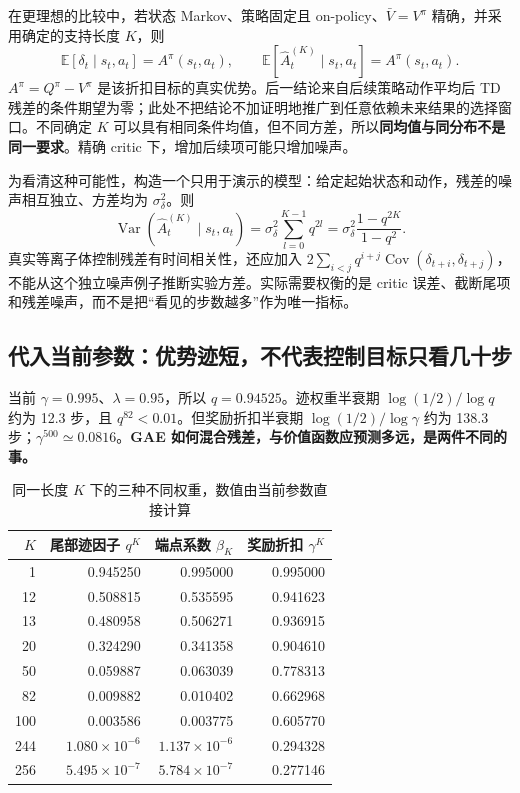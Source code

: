 \documentclass[12pt,fontset=none]{ctexart}
\numberwithin{equation}{section}
\numberwithin{table}{section}
\numberwithin{figure}{section}
\begin{document}
在更理想的比较中，若状态 Markov、策略固定且 on-policy、$\bar V=V^\pi$ 精确，并采用确定的支持长度 $K$，则
\begin{equation}\label{eq:gaet-unbiased}
 \mathbb E[\delta_t\mid s_t,a_t]=A^\pi(s_t,a_t),\qquad
 \mathbb E[\hat A_t^{(K)}\mid s_t,a_t]=A^\pi(s_t,a_t).
\end{equation}
$A^\pi=Q^\pi-V^\pi$ 是该折扣目标的真实优势。后一结论来自后续策略动作平均后 TD 残差的条件期望为零；此处不把结论不加证明地推广到任意依赖未来结果的选择窗口。不同确定 $K$ 可以具有相同条件均值，但不同方差，所以\textbf{同均值与同分布不是同一要求}。精确 critic 下，增加后续项可能只增加噪声。

为看清这种可能性，构造一个只用于演示的模型：给定起始状态和动作，残差的噪声相互独立、方差均为 $\sigma_\delta^2$。则
\begin{equation}\label{eq:gaet-noisevar}
 \operatorname{Var}(\hat A_t^{(K)}\mid s_t,a_t)
 =\sigma_\delta^2\sum_{l=0}^{K-1}q^{2l}
 =\sigma_\delta^2\frac{1-q^{2K}}{1-q^2}.
\end{equation}
真实等离子体控制残差有时间相关性，还应加入 $2\sum_{i<j}q^{i+j}\operatorname{Cov}(\delta_{t+i},\delta_{t+j})$，不能从这个独立噪声例子推断实验方差。实际需要权衡的是 critic 误差、截断尾项和残差噪声，而不是把``看见的步数越多''作为唯一指标。

\subsection{代入当前参数：优势迹短，不代表控制目标只看几十步}

当前 $\gamma=0.995$、$\lambda=0.95$，所以 $q=0.94525$。迹权重半衰期 $\log(1/2)/\log q$ 约为 12.3 步，且 $q^{82}<0.01$。但奖励折扣半衰期 $\log(1/2)/\log\gamma$ 约为 138.3 步；$\gamma^{500}\simeq0.0816$。\textbf{GAE 如何混合残差，与价值函数应预测多远，是两件不同的事。}

\begin{table}[!ht]
\centering\small
\caption{同一长度 $K$ 下的三种不同权重，数值由当前参数直接计算}\label{tab:gaet-weights}
\begin{tabular}{rrrr}
\toprule
$K$ & 尾部迹因子 $q^K$ & 端点系数 $\beta_K$ & 奖励折扣 $\gamma^K$ \\
\midrule
1 & 0.945250 & 0.995000 & 0.995000 \\
12 & 0.508815 & 0.535595 & 0.941623 \\
13 & 0.480958 & 0.506271 & 0.936915 \\
20 & 0.324290 & 0.341358 & 0.904610 \\
50 & 0.059887 & 0.063039 & 0.778313 \\
82 & 0.009882 & 0.010402 & 0.662968 \\
100 & 0.003586 & 0.003775 & 0.605770 \\
244 & $1.080\!\times\!10^{-6}$ & $1.137\!\times\!10^{-6}$ & 0.294328 \\
256 & $5.495\!\times\!10^{-7}$ & $5.784\!\times\!10^{-7}$ & 0.277146 \\
\bottomrule
\end{tabular}
\end{table}
\end{document}
